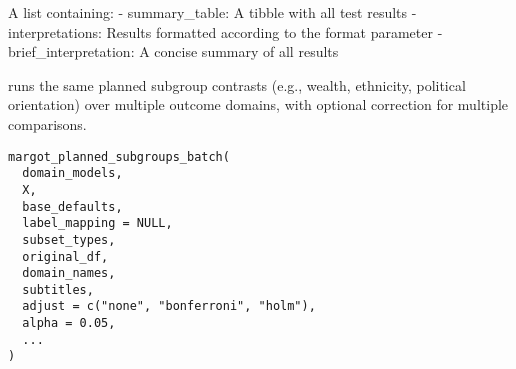\documentclass[a4paper]{book}
\begin{document}
%
\begin{Value}
A list containing:
- summary\_table: A tibble with all test results
- interpretations: Results formatted according to the format parameter
- brief\_interpretation: A concise summary of all results
\end{Value}
%
\begin{Description}
runs the same planned subgroup contrasts (e.g., wealth, ethnicity,
political orientation) over multiple outcome domains, with optional
correction for multiple comparisons.
\end{Description}
%
\begin{Usage}
\begin{verbatim}
margot_planned_subgroups_batch(
  domain_models,
  X,
  base_defaults,
  label_mapping = NULL,
  subset_types,
  original_df,
  domain_names,
  subtitles,
  adjust = c("none", "bonferroni", "holm"),
  alpha = 0.05,
  ...
)
\end{verbatim}
\end{Usage}
%
\end{document}
